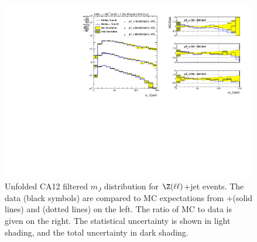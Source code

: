 \begin{figure}[!htb]
\centering
\includegraphics[width=0.99\textwidth]{figs/Zll/jetmassunf_ca12ft_log_Z.pdf}
\caption{Unfolded CA12 filtered $m_J$ distribution for $\Z(\ell\ell)$+jet events. The data (black symbols) are compared to MC expectations from {\MADGRAPH}+\PYTHIA (solid lines) and \HERWIG (dotted lines) on the left. The ratio of MC to data is given on the right.
The statistical uncertainty is shown in light shading, and the total uncertainty in dark shading.}
\label{figs:prunedZmmInt2}
\end{figure}


\clearpage




